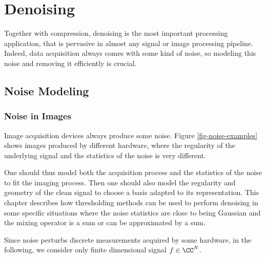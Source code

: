 
\newcommand{\noise}{w}

\chapter{Denoising}


Together with compression, denoising is the most important processing application, that is pervasive in almost any signal or image processing pipeline. Indeed, data acquisition always comes with some kind of noise, so modeling this noise and removing it efficiently is crucial.

\section{Noise Modeling}

\subsection{Noise in Images}

Image acquisition devices always produce some noise. Figure \ref{fig-noise-examples} shows images produced by different hardware, where the regularity of the underlying signal and the statistics of the noise is very different.


One should thus model both the acquisition process and the statistics of the noise to fit the imaging process. Then one should also model the regularity and geometry of the clean signal to choose a basis adapted to its representation. 
This chapter describes how thresholding methods can be used to perform denoising in some specific situations where the noise statistics are close to being Gaussian and the mixing operator is a sum or can be approximated by a sum. 

Since noise perturbs discrete measurements acquired by some hardware, in the following, we consider only finite dimensional signal $f \in \CC^N$.  


